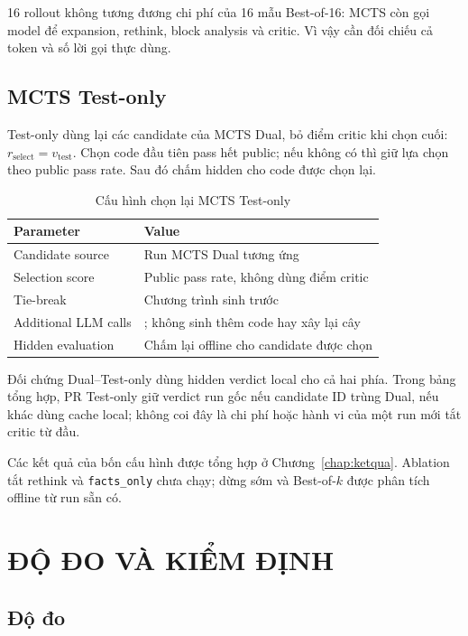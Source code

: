 16 rollout không tương đương chi phí của 16 mẫu Best-of-16: MCTS còn gọi model để expansion, rethink, block analysis và critic. Vì vậy cần đối chiếu cả token và số lời gọi thực dùng.

\subsection{MCTS Test-only}
Test-only dùng lại các candidate của MCTS Dual, bỏ điểm critic khi chọn cuối: $r_{\mathrm{select}}=v_{\mathrm{test}}$. Chọn code đầu tiên pass hết public; nếu không có thì giữ lựa chọn theo public pass rate. Sau đó chấm hidden cho code được chọn lại.

\begin{table}[htbp]
  \caption{Cấu hình chọn lại MCTS Test-only}
  \begin{tabularx}{\linewidth}{>{\raggedright\arraybackslash}p{5cm}>{\raggedright\arraybackslash}X}
    \toprule
    Parameter & Value \\
    \midrule
    Candidate source & Run MCTS Dual tương ứng \\
    Selection score & Public pass rate, không dùng điểm critic \\
    Tie-break & Chương trình sinh trước \\
    Additional LLM calls & 0; không sinh thêm code hay xây lại cây \\
    Hidden evaluation & Chấm lại offline cho candidate được chọn \\
    \bottomrule
  \end{tabularx}
\end{table}

Đối chứng Dual--Test-only dùng hidden verdict local cho cả hai phía. Trong bảng tổng hợp, PR Test-only giữ verdict run gốc nếu candidate ID trùng Dual, nếu khác dùng cache local; không coi đây là chi phí hoặc hành vi của một run mới tắt critic từ đầu.

Các kết quả của bốn cấu hình được tổng hợp ở Chương~\ref{chap:ketqua}. Ablation tắt rethink và \texttt{facts\_only} chưa chạy; dừng sớm và Best-of-$k$ được phân tích offline từ run sẵn có.

\section{ĐỘ ĐO VÀ KIỂM ĐỊNH}
\label{sec:dodo}

\subsection{Độ đo}

